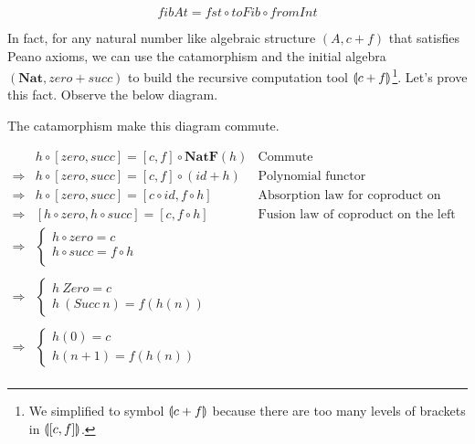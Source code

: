 \documentclass{article}
\begin{document}
\[
fibAt = fst \circ toFib \circ fromInt
\]

In fact, for any natural number like algebraic structure $(A, c + f)$ that satisfies Peano axioms, we can use the catamorphism and the initial algebra $(\mathbf{Nat}, zero + succ)$ to build the recursive computation tool $\llparenthesis c + f \rrparenthesis$\footnote{We simplified to symbol $\llparenthesis c + f \rrparenthesis$ because there are too many levels of brackets in $\llparenthesis [c, f] \rrparenthesis$.}. Let's prove this fact. Observe the below diagram.

\begin{center}
\end{center}

The catamorphism make this diagram commute.

\[
\begin{array}{rll}
            & h \circ [zero, succ] = [c, f] \circ \mathbf{NatF}(h) & \text{Commute} \\
\Rightarrow & h \circ [zero, succ] = [c, f] \circ (id + h) & \text{Polynomial functor} \\
\Rightarrow & h \circ [zero, succ] = [c \circ id, f \circ h] & \text{Absorption law for coproduct on the right} \\
\Rightarrow & [h \circ zero, h \circ succ] = [c, f \circ h] & \text{Fusion law of coproduct on the left} \\
\Rightarrow &
  \begin{cases}
    h \circ zero = c \\
    h \circ succ = f \circ h \\
  \end{cases} & \\
\\
\Rightarrow &
  \begin{cases}
    h\ Zero = c \\
    h\ (Succ\ n) = f(h(n))
  \end{cases} & \\
\\
\Rightarrow &
  \begin{cases}
    h(0) = c \\
    h(n + 1) = f(h(n))
  \end{cases} & \\
\end{array}
\]
\end{document}
